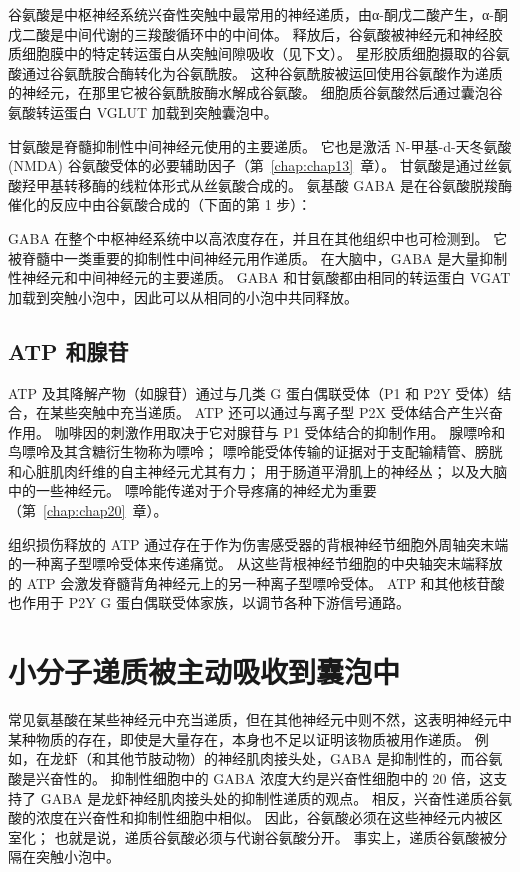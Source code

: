 谷氨酸是中枢神经系统兴奋性突触中最常用的神经递质，由α-酮戊二酸产生，α-酮戊二酸是中间代谢的三羧酸循环中的中间体。
释放后，谷氨酸被神经元和神经胶质细胞膜中的特定转运蛋白从突触间隙吸收（见下文）。
星形胶质细胞摄取的谷氨酸通过谷氨酰胺合酶转化为谷氨酰胺。
这种谷氨酰胺被运回使用谷氨酸作为递质的神经元，在那里它被谷氨酰胺酶水解成谷氨酸。
细胞质谷氨酸然后通过囊泡谷氨酸转运蛋白 VGLUT 加载到突触囊泡中。


甘氨酸是脊髓抑制性中间神经元使用的主要递质。
它也是激活 N-甲基-d-天冬氨酸 (NMDA) 谷氨酸受体的必要辅助因子（第~\ref{chap:chap13}~章）。
甘氨酸是通过丝氨酸羟甲基转移酶的线粒体形式从丝氨酸合成的。
氨基酸 GABA 是在谷氨酸脱羧酶催化的反应中由谷氨酸合成的（下面的第 1 步）：


GABA 在整个中枢神经系统中以高浓度存在，并且在其他组织中也可检测到。
它被脊髓中一类重要的抑制性中间神经元用作递质。
在大脑中，GABA 是大量抑制性神经元和中间神经元的主要递质。
GABA 和甘氨酸都由相同的转运蛋白 VGAT 加载到突触小泡中，因此可以从相同的小泡中共同释放。



\subsection{ATP 和腺苷}

ATP 及其降解产物（如腺苷）通过与几类 G 蛋白偶联受体（P1 和 P2Y 受体）结合，在某些突触中充当递质。
ATP 还可以通过与离子型 P2X 受体结合产生兴奋作用。
咖啡因的刺激作用取决于它对腺苷与 P1 受体结合的抑制作用。
腺嘌呤和鸟嘌呤及其含糖衍生物称为嘌呤；
嘌呤能受体传输的证据对于支配输精管、膀胱和心脏肌肉纤维的自主神经元尤其有力；
用于肠道平滑肌上的神经丛；
以及大脑中的一些神经元。
嘌呤能传递对于介导疼痛的神经尤为重要（第~\ref{chap:chap20}~章）。


组织损伤释放的 ATP 通过存在于作为伤害感受器的背根神经节细胞外周轴突末端的一种离子型嘌呤受体来传递痛觉。
从这些背根神经节细胞的中央轴突末端释放的 ATP 会激发脊髓背角神经元上的另一种离子型嘌呤受体。
ATP 和其他核苷酸也作用于 P2Y G 蛋白偶联受体家族，以调节各种下游信号通路。



\section{小分子递质被主动吸收到囊泡中}

常见氨基酸在某些神经元中充当递质，但在其他神经元中则不然，这表明神经元中某种物质的存在，即使是大量存在，本身也不足以证明该物质被用作递质。
例如，在龙虾（和其他节肢动物）的神经肌肉接头处，GABA 是抑制性的，而谷氨酸是兴奋性的。
抑制性细胞中的 GABA 浓度大约是兴奋性细胞中的 20 倍，这支持了 GABA 是龙虾神经肌肉接头处的抑制性递质的观点。
相反，兴奋性递质谷氨酸的浓度在兴奋性和抑制性细胞中相似。
因此，谷氨酸必须在这些神经元内被区室化；
也就是说，递质谷氨酸必须与代谢谷氨酸分开。
事实上，递质谷氨酸被分隔在突触小泡中。


